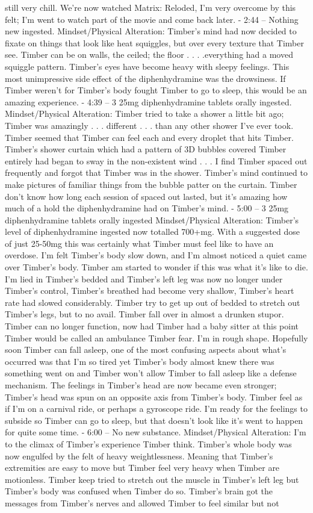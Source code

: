 \documentclass[12pt]{book}
\begin{document}
still very chill. We're now watched Matrix: Reloded, I'm very overcome by this felt; I'm went to watch part of the movie and come back later. - 2:44 -- Nothing new ingested. Mindset/Physical Alteration: Timber's mind had now decided to fixate on things that look like heat squiggles, but over every texture that Timber see. Timber can be on walls, the ceiled; the floor . . . .everything had a moved squiggle pattern. Timber's eyes have become heavy with sleepy feelings. This most unimpressive side effect of the diphenhydramine was the drowsiness. If Timber weren't for Timber's body fought Timber to go to sleep, this would be an amazing experience. - 4:39 -- 3 25mg diphenhydramine tablets orally ingested. Mindset/Physical Alteration: Timber tried to take a shower a little bit ago; Timber was amazingly . . . different . . . than any other shower I've ever took. Timber seemed that Timber can feel each and every droplet that hits Timber. Timber's shower curtain which had a pattern of 3D bubbles covered Timber entirely had began to sway in the non-existent wind . . . I find Timber spaced out frequently and forgot that Timber was in the shower. Timber's mind continued to make pictures of familiar things from the bubble patter on the curtain. Timber don't know how long each session of spaced out lasted, but it's amazing how much of a hold the diphenhydramine had on Timber's mind. - 5:00 -- 3 25mg diphenhydramine tablets orally ingested Mindset/Physical Alteration: Timber's level of diphenhydramine ingested now totalled 700+mg. With a suggested dose of just 25-50mg this was certainly what Timber must feel like to have an overdose. I'm felt Timber's body slow down, and I'm almost noticed a quiet came over Timber's body. Timber am started to wonder if this was what it's like to die. I'm lied in Timber's bedded and Timber's left leg was now no longer under Timber's control, Timber's breathed had become very shallow, Timber's heart rate had slowed considerably. Timber try to get up out of bedded to stretch out Timber's legs, but to no avail. Timber fall over in almost a drunken stupor. Timber can no longer function, now had Timber had a baby sitter at this point Timber would be called an ambulance Timber fear. I'm in rough shape. Hopefully soon Timber can fall asleep, one of the most confusing aspects about what's occurred was that I'm so tired yet Timber's body almost knew there was something went on and Timber won't allow Timber to fall asleep like a defense mechanism. The feelings in Timber's head are now became even stronger; Timber's head was spun on an opposite axis from Timber's body. Timber feel as if I'm on a carnival ride, or perhaps a gyroscope ride. I'm ready for the feelings to subside so Timber can go to sleep, but that doesn't look like it's went to happen for quite some time. - 6:00 -- No new substance. Mindset/Physical Alteration: I'm to the climax of Timber's experience Timber think. Timber's whole body was now engulfed by the felt of heavy weightlessness. Meaning that Timber's extremities are easy to move but Timber feel very heavy when Timber are motionless. Timber keep tried to stretch out the muscle in Timber's left leg but Timber's body was confused when Timber do so. Timber's brain got the messages from Timber's nerves and allowed Timber to feel similar but not 
\end{document}
